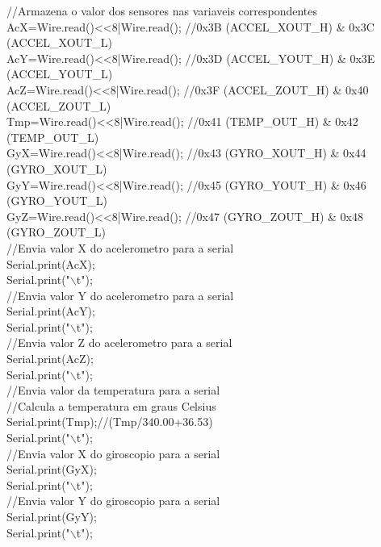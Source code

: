 \begin{anexosenv}
	//Armazena o valor dos sensores nas variaveis correspondentes\\
	AcX=Wire.read()<<8|Wire.read();  //0x3B (ACCEL\_XOUT\_H) \& 0x3C (ACCEL\_XOUT\_L)    \\ 
	AcY=Wire.read()<<8|Wire.read();  //0x3D (ACCEL\_YOUT\_H) \& 0x3E (ACCEL\_YOUT\_L)\\
	AcZ=Wire.read()<<8|Wire.read();  //0x3F (ACCEL\_ZOUT\_H) \& 0x40 (ACCEL\_ZOUT\_L)\\
	Tmp=Wire.read()<<8|Wire.read();  //0x41 (TEMP\_OUT\_H) \& 0x42 (TEMP\_OUT\_L)\\
	GyX=Wire.read()<<8|Wire.read();  //0x43 (GYRO\_XOUT\_H) \& 0x44 (GYRO\_XOUT\_L)\\
	GyY=Wire.read()<<8|Wire.read();  //0x45 (GYRO\_YOUT\_H) \& 0x46 (GYRO\_YOUT\_L)\\
	GyZ=Wire.read()<<8|Wire.read();  //0x47 (GYRO\_ZOUT\_H) \& 0x48 (GYRO\_ZOUT\_L)\\
	
	
	//Envia valor X do acelerometro para a serial\\
	Serial.print(AcX);\\
	Serial.print("$\backslash$t");\\
	
	//Envia valor Y do acelerometro para a serial\\ 
	Serial.print(AcY);\\  
	Serial.print("$\backslash$t");\\
	
	//Envia valor Z do acelerometro para a serial\\
	Serial.print(AcZ);\\
	Serial.print("$\backslash$t");\\
	
	//Envia valor da temperatura para a serial\\
	//Calcula a temperatura em graus Celsius\\
	Serial.print(Tmp);//(Tmp/340.00+36.53)\\
	Serial.print("$\backslash$t");\\
	
	//Envia valor X do giroscopio para a serial\\ 
	Serial.print(GyX);\\
	Serial.print("$\backslash$t");\\
	
	//Envia valor Y do giroscopio para a serial\\   
	Serial.print(GyY);\\
	Serial.print("$\backslash$t");\\
	

\end{anexosenv}
